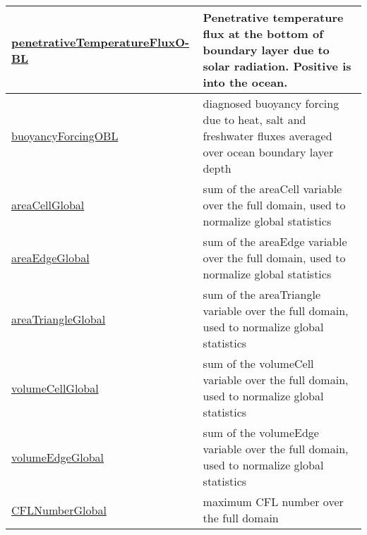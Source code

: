 {\begin{center}
\begin{longtable}{| p{2.0in} | p{4.0in} |}
	\hline
	\hyperref[subsec:var_sec_diagnostics_penetrativeTemperatureFluxOBL]{penetrativeTemperatureFluxO-}\hyperref[subsec:var_sec_diagnostics_penetrativeTemperatureFluxOBL]{BL  }& Penetrative temperature flux at the bottom of boundary layer due to solar radiation. Positive is into the ocean. \\
	\hline
	\hyperref[subsec:var_sec_diagnostics_buoyancyForcingOBL]{buoyancyForcingOBL} & diagnosed buoyancy forcing due to heat, salt and freshwater fluxes averaged over ocean boundary layer depth \\
	\hline
	\hyperref[subsec:var_sec_diagnostics_areaCellGlobal]{areaCellGlobal} & sum of the areaCell variable over the full domain, used to normalize global statistics \\
	\hline
	\hyperref[subsec:var_sec_diagnostics_areaEdgeGlobal]{areaEdgeGlobal} & sum of the areaEdge variable over the full domain, used to normalize global statistics \\
	\hline
	\hyperref[subsec:var_sec_diagnostics_areaTriangleGlobal]{areaTriangleGlobal} & sum of the areaTriangle variable over the full domain, used to normalize global statistics \\
	\hline
	\hyperref[subsec:var_sec_diagnostics_volumeCellGlobal]{volumeCellGlobal} & sum of the volumeCell variable over the full domain, used to normalize global statistics \\
	\hline
	\hyperref[subsec:var_sec_diagnostics_volumeEdgeGlobal]{volumeEdgeGlobal} & sum of the volumeEdge variable over the full domain, used to normalize global statistics \\
	\hline
	\hyperref[subsec:var_sec_diagnostics_CFLNumberGlobal]{CFLNumberGlobal} & maximum CFL number over the full domain \\
	\hline
\end{longtable}
\end{center}
}
